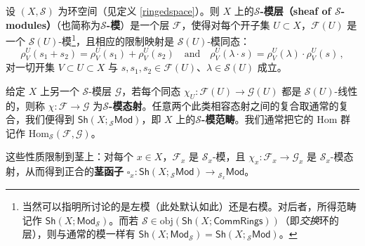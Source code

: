 \begin{Def}											%
设 $(X,\mathcal{S})$ 为环空间（见定义 \ref{ringedspace}）。则 $X$ 上的\textbf{$\mathcal{S}$-模层（sheaf of $\mathcal{S}$-modules）}（也简称为\textbf{$\mathcal{S}$-模}）是一个层 $\mathcal{F}$，使得对每个开子集 $U\subset X$，$\mathcal{F}(U)$ 是一个 $\mathcal{S}(U)$-模\footnote{当然可以指明所讨论的是左模（此处默认如此）还是右模。对后者，所得范畴记作 $\mathsf{Sh}(X;\mathsf{Mod}_\mathcal{S})$。而若 $\mathcal{S}\in\text{obj}(\mathsf{Sh}(X;\mathsf{CommRings}))$（即\textit{交换}环的层），则与通常的模一样有 $\mathsf{Sh}(X;\mathsf{Mod}_\mathcal{S})=\mathsf{Sh}(X;{}_\mathcal{S}\mathsf{Mod})$。}，且相应的限制映射是 $\mathcal{S}(U)$-模同态：
\[
\rho^U_V(s_1+s_2)=\rho^U_V(s_1)+\rho^U_V(s_2)\quad\text{and}\quad \rho^U_V(\lambda\cdot s)=\rho^U_V(\lambda)\cdot\rho^U_V(s)\,,
\]
对一切开集 $V\subset U\subset X$ 与 $s,s_1,s_2\in\mathcal{F}(U)$、$\lambda\in\mathcal{S}(U)$ 成立。

给定 $X$ 上另一个 $\mathcal{S}$-模层 $\mathcal{G}$，若每个同态 $\chi_U:\mathcal{F}(U)\rightarrow\mathcal{G}(U)$ 都是 $\mathcal{S}(U)$-线性的，则称 $\chi:\mathcal{F}\rightarrow\mathcal{G}$ 为\textbf{$\mathcal{S}$-模态射}。任意两个此类相容态射之间的复合取通常的复合，我们便得到 $\mathsf{Sh}(X;{}_\mathcal{S}\mathsf{Mod})$，即 $X$ 上的\textbf{$\mathcal{S}$-模范畴}。我们通常把它的 Hom 群记作 $\text{Hom}_\mathcal{S}(\mathcal{F},\mathcal{G})$。

这些性质限制到茎上：对每个 $x\in X$，$\mathcal{F}_x$ 是 $\mathcal{S}_x$-模，且 $\chi_x:\mathcal{F}_x\rightarrow\mathcal{G}_x$ 是 $\mathcal{S}_x$-模态射，从而得到正合的\textbf{茎函子} $\square_x:\mathsf{Sh}(X;{}_\mathcal{S}\mathsf{Mod})\rightarrow{}_{\mathcal{S}_x}\!\mathsf{Mod}$。
\end{Def}

